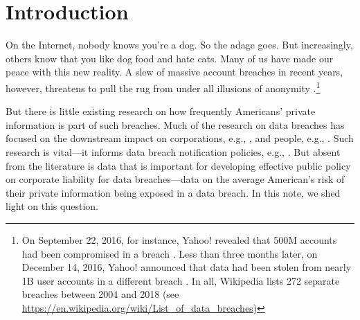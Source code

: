 \documentclass[sigconf]{acmart}
\begin{document}


%

%

%
\maketitle

\section{Introduction}
On the Internet, nobody knows you're a dog. So the adage goes. But increasingly, others know that you like dog food and hate cats. Many of us have made our peace with this new reality. A slew of massive account breaches in recent years, however, threatens to pull the rug from under all illusions of anonymity \cite{mccandless}.\footnote{On September 22, 2016, for instance, Yahoo! revealed that 500M accounts had been compromised in a breach \cite{fiegerman}. Less than three months later, on December 14, 2016, Yahoo! announced that data had been stolen from nearly 1B user accounts in a different breach \cite{newman}. In all, Wikipedia lists 272 separate breaches between 2004 and 2018 (see \href{https://en.wikipedia.org/wiki/List_of_data_breaches}{https://en.wikipedia.org/wiki/List\_of\_data\_breaches})}

But there is little existing research on how frequently Americans' private information is part of such breaches. Much of the research on data breaches has focused on the downstream impact on corporations, e.g., \cite{whitler2017impact, rosati2019social, janakiraman2018effect}, and people, e.g., \cite{cross2019media, mikhed2018data, curtis2018consumer}. Such research is vital---it informs data breach notification policies, e.g., \cite{nieuwesteeg2018analysis, marcus2018data, kuhn2018147}. But absent from the literature is data that is important for developing effective public policy on corporate liability for data breaches---data on the average American's risk of their private information being exposed in a data breach. In this note, we shed light on this question.
\end{document}
